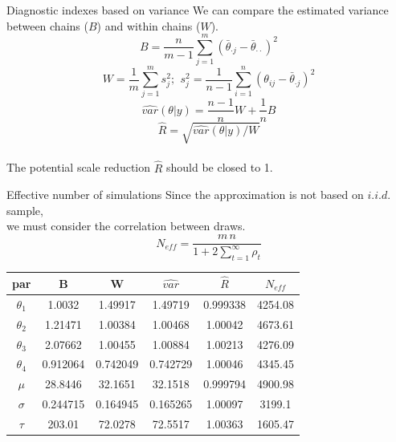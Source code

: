 \begin{frame}{Diagnostic indexes based on variance}
	We can compare the estimated variance between chains ($B$) and within chains ($W$).
	$$ B = \dfrac{n}{m-1} \sum_{j=1}^{m} (\bar{\theta}_{\cdot j} - \bar{\theta}_{\cdot \cdot})^2$$ 
	$$W = \dfrac{1}{m} \sum_{j=1}^{m} s_j^2; \,\ s_j^2 = \dfrac{1}{n-1} \sum_{i=1}^{n} (\theta_{ij} - \bar{\theta}_{\cdot j})^2$$
	$$\hat{var}(\theta|y)=\dfrac{n-1}{n} W + \dfrac{1}{n} B$$ 
	$$\hat{R} = \sqrt{\hat{var}(\theta|y)/W}$$\\
	\vspace{.1in}
	The potential scale reduction $\hat{R}$ should be closed to 1.
\end{frame}

\begin{frame}{Effective number of simulations}
Since the approximation is not based on $i.i.d.$ sample,\\
we must consider the correlation between draws.
$$N_{eff} = \dfrac{m \, n}{1+2 \sum_{t=1}^{\infty} \rho_t}$$

	\begin{center}
		\small
		\begin{tabular}{|c| c c c c c|}
			\hline	
	par & B & W & $\hat{var}$ & $\hat{R}$ & $N_{eff}$\\
	\hline	
	$\theta_1$ & 1.0032   & 1.49917 & 1.49719 & 0.999338& 4254.08\\
	$\theta_2$ & 1.21471  & 1.00384 & 1.00468 & 1.00042 & 4673.61\\
	$\theta_3$ & 2.07662  & 1.00455 & 1.00884 & 1.00213 & 4276.09\\
	$\theta_4$ & 0.912064 & 0.742049& 0.742729& 1.00046 & 4345.45\\
	$\mu$ 	   & 28.8446  & 32.1651 & 32.1518 & 0.999794& 4900.98\\
	$\sigma$   & 0.244715 & 0.164945& 0.165265& 1.00097 & 3199.1\\
	$\tau$ 	   & 203.01   & 72.0278 & 72.5517 & 1.00363 & 1605.47\\
	\hline	
		\end{tabular}
	\end{center}
\end{frame}